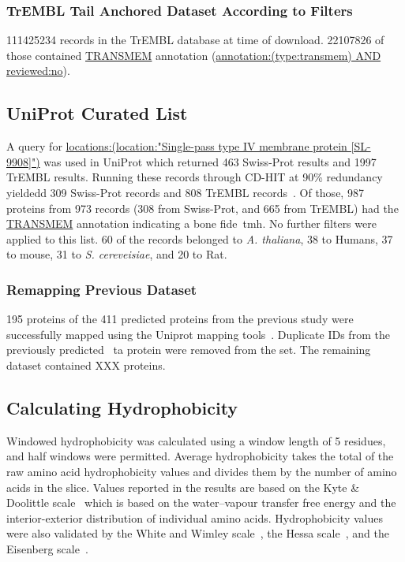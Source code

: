 \subsubsection{TrEMBL Tail Anchored Dataset According to Filters}
111425234 records in the TrEMBL database at time of download.
22107826 of those contained \url{TRANSMEM} annotation (\url{annotation:(type:transmem) AND reviewed:no}).


\subsection{UniProt Curated List}
A query for \url{locations:(location:"Single-pass type IV membrane protein [SL-9908]")} was used in UniProt which returned 463 Swiss-Prot results and 1997 TrEMBL results.
Running these records through CD-HIT at 90\% redundancy yieldedd 309 Swiss-Prot records and 808 TrEMBL records~\cite{Huang2010, Wu2011}.
Of those, 987 proteins from 973 records (308 from Swiss-Prot, and 665 from TrEMBL) had the \url{TRANSMEM} annotation indicating a bone fide~\gls{tmh}.
No further filters were applied to this list.
60 of the records belonged to \textit{A. thaliana}, 38 to Humans, 37 to mouse, 31 to \textit{S. cereveisiae}, and 20 to Rat.


\subsubsection{Remapping Previous Dataset}
195 proteins of the 411 predicted proteins from the previous study were successfully mapped using the Uniprot mapping tools~\cite{TheUniProtConsortium2014}.
Duplicate IDs from the previously predicted ~\gls{ta} protein were removed from the set.
The remaining dataset contained XXX proteins.

\subsection{Calculating Hydrophobicity}
Windowed hydrophobicity was calculated using a window length of 5 residues, and half windows were permitted.
Average hydrophobicity takes the total of the raw amino acid hydrophobicity values and divides them by the number of amino acids in the slice.
Values reported in the results are based on the Kyte \& Doolittle scale~\cite{Kyte1982} which is based on the water\---vapour transfer free energy and the interior-exterior distribution of individual amino acids.
Hydrophobicity values were also validated by the White and Wimley scale~\cite{White1999}, the Hessa scale~\cite{Hessa2005}, and the Eisenberg scale~\cite{Eisenberg1984}.

